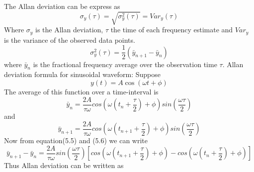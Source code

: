 The Allan deviation can be express as
\begin{equation}
\sigma_y(\tau)=\sqrt{\sigma_y^2(\tau)}=Var_y(\tau)
\end{equation}
Where $\sigma_y$ is the Allan deviation, $\tau$ the time of each frequency estimate and $Var_y$ is the variance of the observed data points.
\begin{equation}
{\sigma_y^2(\tau)}=\frac{1}{2}(\bar{y}_{n+1}-\bar{y}_{n})
\end{equation}
where $\bar{y}_{n}$ is the fractional frequency average over the observation time $\tau$.
Allan deviation formula for sinusoidal waveform:
Suppose
\begin{equation}
y(t) = A\cos (\omega t + \phi)
\end{equation}
The average of this function over a time-interval  is
\begin{equation}
\bar{y}_{n}=\frac{2A}
{\tau \omega}
cos(\omega(t_n +\frac{\tau}{2})+\phi)sin(\frac{\omega \tau}{2})
\end{equation}
and
\begin{equation}
\bar{y}_{n+1}=\frac{2A}
{\tau \omega}
cos(\omega(t_{n+1} +\frac{\tau}{2})+\phi)sin(\frac{\omega \tau}{2})
\end{equation}
Now from equation(5.5) and (5.6) we can write
\begin{equation}
\bar{y}_{n+1}-\bar{y}_{n}=\frac{2A}
{\tau \omega}sin(\frac{\omega \tau}{2})[cos( \omega(t_{n+1} +\frac{\tau}{2})+\phi)-cos(\omega(t_n +\frac{\tau}{2})+\phi)]
\end{equation}
Thus Allan deviation can be written as

